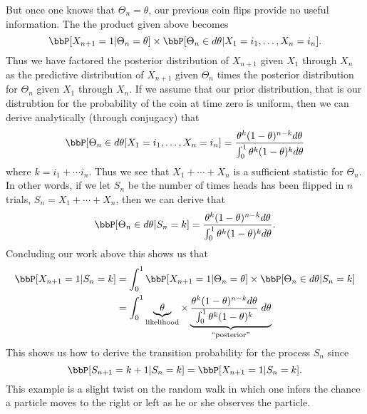 \documentclass{report}
\begin{document}
\begin{example}
But once one knows that $\Theta_{n} = \theta$, our previous coin flips provide no useful information.  The the product given above becomes
\[
\bbP[ X_{n+1} = 1 | \Theta_{n} = \theta] \times
\bbP[ \Theta_{n} \in d \theta | X_1 = i_1, \ldots, X_n = i_n].
\]
Thus we have factored the posterior distribution of $X_{n+1}$ given $X_1$ through $X_n$ as the predictive distribution of $X_{n+1}$ given $\Theta_n$ times the posterior distribution for $\Theta_n$ given $X_1$ through $X_n$.  If we assume that our prior distribution, that is our distrubtion for the probability of the coin at time zero is uniform, then we can derive analytically (through conjugacy) that
\[
\bbP[ \Theta_n \in d \theta | X_1 = i_1, \ldots, X_n = i_n]
= \frac{\theta^k (1 - \theta)^{n-k} d \theta }{\int_0^1 \theta^k (1-\theta)^k d\theta}
\]
where $k = i_1 + \cdots i_n$.  Thus we see that $X_1 + \cdots + X_n$ is a sufficient statistic for $\Theta_n$.  In other words, if we let $S_n$ be the number of times heads has been flipped in $n$ trials, $S_n = X_1 + \cdots + X_n$, then we can derive that
\[
\bbP[\Theta_n \in d \theta | S_n = k] 
= \frac{\theta^k (1 - \theta)^{n-k} d \theta }{\int_0^1 \theta^k (1-\theta)^k d\theta}.
\]
Concluding our work above this shows us that
\begin{align*}
\bbP[X_{n+1} = 1 | S_n = k]  
& = \int_0^1 \bbP[X_{n+1} = 1 | \Theta_n = \theta] \times \bbP[ \Theta_n \in d \theta | S_n = k] \\
& = \int_0^1 \underbrace{\theta}_{\textmd{likelihood}} \times \underbrace{\frac{\theta^k (1 - \theta)^{n-k} d \theta }{\int_0^1 \theta^k (1-\theta)^k } \; d \theta}_{\textmd{``posterior''}}
\end{align*}
This shows us how to derive the transition probability for the process $S_n$ since
\[
\bbP[S_{n+1} = k+1 | S_n = k] = \bbP[X_{n+1} = 1 | S_n = k].
\]
This example is a slight twist on the random walk in which one infers the chance a particle moves to the right or left as he or she observes the particle.

\begin{comment}
\begin{remark}
This example also illustrates a fable articulated by Nasim Taleb.  Imagine a turkey that lives happily alone on a farm.  Every day the turkey, who has deep existensial concerns, records whether he lives or does not live through the day.  He is not told with what chance he will live, but he assumes that every day is more or less like the last.  After living for $n$ consecutive days the turkey's posterior probability prediction that he will live tomorrow is given by
\[
\bbP[X_{n+1} = 1 | S_n = n] = \frac{\int_0^1 \theta^{n+1} d \theta}{\int_0^1 \theta^n d \theta} = \frac{n+1}{n+2}. 
\]
Thus the turkey thinks it is very likely that he will live tomorrow. 
...


\end{comment}
\end{example}
\end{document}
